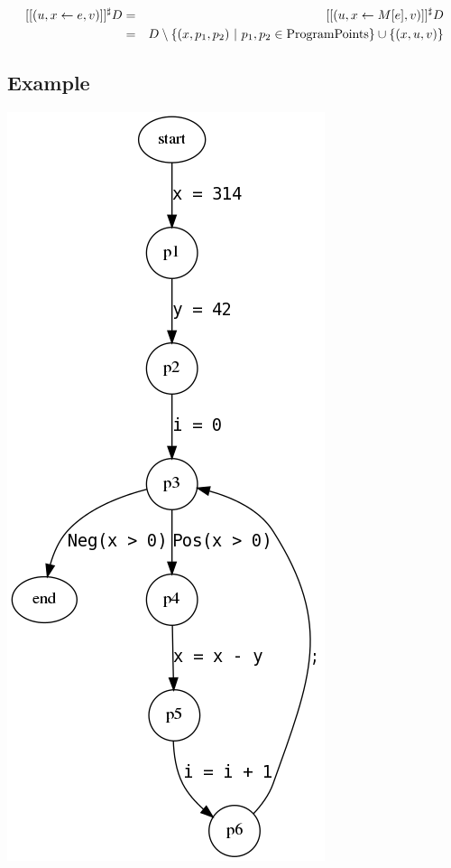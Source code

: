 \documentclass[a4paper]{article}
\begin{document}
\begin{eqnarray*}
  [[(u, x \leftarrow e, v)]]^\sharp D &=& [[(u, x \leftarrow M[e], v)]]^\sharp
  D \\ &=& D \setminus \{ (x, p_1, p_2)\ |\ p_1, p_2 \in \mathrm{ProgramPoints} \} \cup \{ (x, u, v) \}
\end{eqnarray*}


\subsection*{Example}

\includegraphics[scale=0.3]{6-1.png}
\end{document}

